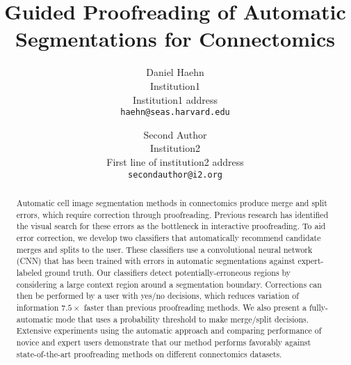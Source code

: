 \documentclass[10pt,twocolumn,letterpaper]{article}
\begin{document}
\title{Guided Proofreading of Automatic Segmentations for Connectomics}

\author{Daniel Haehn\\
Institution1\\
Institution1 address\\
{\tt\small haehn@seas.harvard.edu}
\and
Second Author\\
Institution2\\
First line of institution2 address\\
{\tt\small secondauthor@i2.org}
}

\maketitle

\begin{abstract}
%
Automatic cell image segmentation methods in connectomics produce merge and
split errors, which require correction through proofreading. Previous research
has identified the visual search for these errors as the bottleneck in
interactive proofreading. To aid error correction, we develop two classifiers
that automatically recommend candidate merges and splits to the user. These
classifiers use a convolutional neural network (CNN) that has been trained with
errors in automatic segmentations against expert-labeled ground truth. Our
classifiers detect potentially-erroneous regions by considering a large context
region around a segmentation boundary. Corrections can then be performed by a
user with yes/no decisions, which reduces variation of information $7.5\times$ faster than previous
proofreading methods. We also present a fully-automatic mode that uses a
probability threshold to make merge/split decisions. Extensive experiments using
the automatic approach and comparing performance of novice and expert users
demonstrate that our method performs favorably against state-of-the-art
proofreading methods on different connectomics datasets.
%
\end{abstract}














{\small


}
\end{document}
